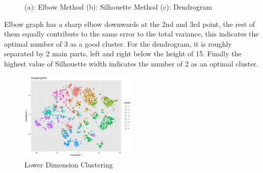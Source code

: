 \documentclass[11pt]{article} %
\begin{document}
\begin{figure}[H]
    \centering
    \caption{(a): Elbow Method  (b): Silhouette Method (c): Dendrogram}
    \label{fig:foobar}
\end{figure}

\quad Elbow graph has a sharp elbow downwards at the 2nd and 3rd point, the rest of them equally contribute to the same error to the total variance, this indicates the optimal number of 3 as a good cluster. For the dendrogram, it is roughly separated by 2 main parts, left and right below the height of 15. Finally the highest value of Silhouette width indicates the number of 2 as an optimal cluster.

\begin{figure}[H]
    \centering
    \includegraphics[width=0.5\textwidth]{Pengju/p-t-5.jpg}
    \caption{Lower Dimension Clustering}
    \label{fig:foobar}
\end{figure}
\end{document}
